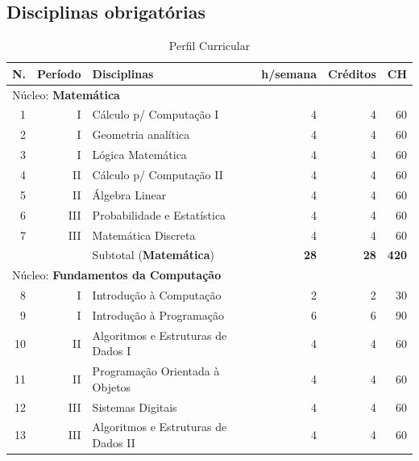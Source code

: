 \documentclass[
	12pt,				%
	openright,			%
  oneside,     %
	a4paper,			%
	chapter=TITLE,		%
	english,			%
	french,				%
	spanish,			%
	brazil				%
	]{abntex2}
\begin{document}
\begin{apendicesenv}
\chapter{Disciplinas obrigatórias}
\begin{longtable}{r|r|l|r|r|r}
     \caption{Perfil Curricular}
     \label{ltab:teste}
     \\
\hline
    N.    & Período & Disciplinas                       & h/semana & Créditos & CH \\ \hline
\multicolumn{6}{l}{Núcleo: \textbf{Matemática}}\\                                     \hline 
    1     & I       & Cálculo p/ Computação I           & 4     & 4        & 60 \\ \hline
    2     & I       & Geometria analítica               & 4     & 4        & 60 \\ \hline
    3     & I       & Lógica Matemática                 & 4     & 4        & 60 \\ \hline
    4     & II      & Cálculo p/ Computação II          & 4     & 4     & 60 \\     \hline
    5     & II      & Álgebra Linear                    & 4     & 4     & 60 \\     \hline
    6     & III     & Probabilidade e Estatística       & 4     & 4     & 60 \\     \hline
    7     & III     & Matemática Discreta               & 4     & 4     & 60 \\     \hline
          &         & Subtotal (\textbf{Matemática})    & \textbf{28}    & \textbf{28}    & \textbf{420} \\ \hline
\multicolumn{6}{l}{Núcleo: \textbf{Fundamentos da Computação}} \\ \hline
    8     & I     & Introdução à Computação & 2     & 2     & 30 \\ \hline
    9     & I     & Introdução à Programação & 6     & 6     & 90 \\ \hline
    10    & II    & Algoritmos e Estruturas de Dados I & 4     & 4     & 60 \\ \hline
    11    & II    & Programação Orientada à Objetos & 4     & 4     & 60 \\ \hline
    12    & III   & Sistemas Digitais & 4     & 4     & 60 \\ \hline
    13    & III   & Algoritmos e Estruturas de Dados II & 4     & 4     & 60 \\ \hline

\end{longtable}
\end{apendicesenv}
\end{document}
